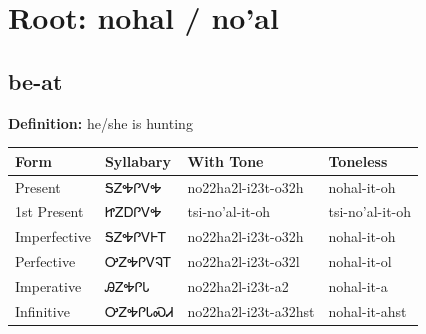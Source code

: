\documentclass{article}%
\begin{document}
%
\normalsize%
\section*{Root: nohal / no'al}%
\subsection*{be-at}%
\textbf{Definition: }%
he/she is hunting%
\\[0.5em]%
\begin{tabular}{|l|l|l|l|}%
\hline%
\textbf{Form}&\textbf{Syllabary}&\textbf{With Tone}&\textbf{Toneless}\\%
\hline%
Present&ᎦᏃᎭᎵᏙᎭ&no22ha2l{-}i23t{-}o32h&nohal{-}it{-}oh\\%
1st Present&ᏥᏃᎠᎵᏙᎭ&tsi{-}no'al{-}it{-}oh&tsi{-}no'al{-}it{-}oh\\%
Imperfective&ᎦᏃᎭᎵᏙᎰᎢ&no22ha2l{-}i23t{-}o32h&nohal{-}it{-}oh\\%
Perfective&ᎤᏃᎭᎵᏙᎸᎢ&no22ha2l{-}i23t{-}o32l&nohal{-}it{-}ol\\%
Imperative&ᎯᏃᎭᎵᏓ&no22ha2l{-}i23t{-}a2&nohal{-}it{-}a\\%
Infinitive&ᎤᏃᎭᎵᏓᏍᏗ&no22ha2l{-}i23t{-}a32hst&nohal{-}it{-}ahst\\%
\hline%
\end{tabular}%
\\[1em]%
\end{document}
